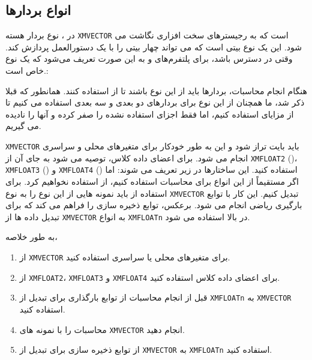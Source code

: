 \subsection{\textbf{انواع بردارها}}
{
    \Large
    \begin{spacing}{1.5}
        در ، نوع بردار هسته \texttt{XMVECTOR} است که به رجیسترهای سخت افزاری  نگاشت می شود.
        این یک نوع  بیتی است که می تواند چهار   بیتی را با یک دستورالعمل  پردازش کند.
        وقتی  در دسترس باشد، برای پلتفرم‌های  و  به این صورت تعریف می‌شود که  یک نوع  خاص است.:

        \begin{flushleft}
        \end{flushleft}

        هنگام انجام محاسبات، بردارها باید از این نوع باشند تا از  استفاده کنند.
        همانطور که قبلا ذکر شد، ما همچنان از این نوع برای بردارهای دو بعدی و سه بعدی استفاده می کنیم تا از مزایای  استفاده کنیم،
        اما فقط اجزای استفاده نشده را صفر کرده و آنها را نادیده می گیریم.

        \texttt{XMVECTOR} باید  بایت تراز شود و این به طور خودکار برای متغیرهای محلی و سراسری انجام می شود.
        برای اعضای داده کلاس، توصیه می شود به جای آن از \texttt{XMFLOAT2} ()، \texttt{XMFLOAT3} () و \texttt{XMFLOAT4} () استفاده کنید. این ساختارها در زیر تعریف می شوند:
        \textbf{\vspace{6pt}}
        \lr{}
        \textbf{\vspace{6pt}}
        اما اگر مستقیماً از این انواع برای محاسبات استفاده کنیم، از  استفاده نخواهیم کرد.
        برای استفاده از  باید نمونه هایی از این نوع را به نوع \texttt{XMVECTOR} تبدیل کنیم.
        این کار با توابع بارگیری ریاضی  انجام می شود.
        برعکس،  توابع ذخیره سازی را فراهم می کند که برای تبدیل داده ها از \texttt{XMVECTOR} به انواع \texttt{XMFLOATn} در بالا استفاده می شود.

        به طور خلاصه،

        \begin{enumerate}
            \item {از \texttt{XMVECTOR} برای متغیرهای محلی یا سراسری استفاده کنید.}
            \item {از \texttt{XMFLOAT2}، \texttt{XMFLOAT3} و \texttt{XMFLOAT4} برای اعضای داده کلاس استفاده کنید.}
            \item {قبل از انجام محاسبات از توابع بارگذاری برای تبدیل از \texttt{XMFLOATn} به \texttt{XMVECTOR} استفاده کنید.}
            \item {محاسبات را با نمونه های \texttt{XMVECTOR} انجام دهید.}
            \item {از توابع ذخیره سازی برای تبدیل از \texttt{XMVECTOR} به \texttt{XMFLOATn} استفاده کنید.}
        \end{enumerate}
    \end{spacing}
}

